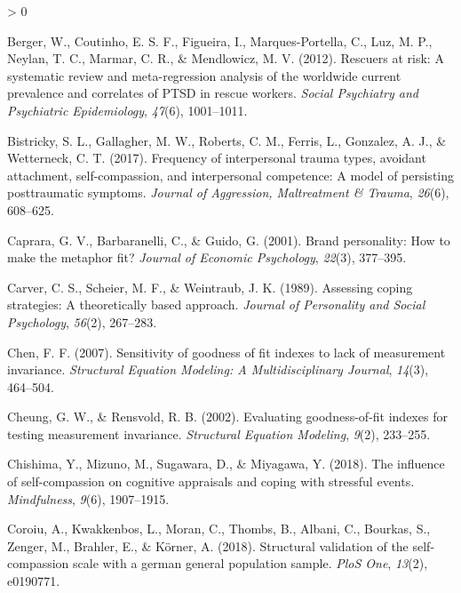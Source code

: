 \documentclass[
  english,
  man,floatsintext]{apa7}
\newlength{\cslhangindent}
\newenvironment{CSLReferences}[2] %
 {%
  \setlength{\parindent}{0pt}
  \ifodd #1 \everypar{\setlength{\hangindent}{\cslhangindent}}\ignorespaces\fi
  \ifnum #2 > 0
  \setlength{\parskip}{#2\baselineskip}
  \fi
 }%
 {}
\begin{document}
\begin{CSLReferences}{1}{0}
\leavevmode\hypertarget{ref-berger2012rescuers}{}%
Berger, W., Coutinho, E. S. F., Figueira, I., Marques-Portella, C., Luz, M. P., Neylan, T. C., Marmar, C. R., \& Mendlowicz, M. V. (2012). Rescuers at risk: A systematic review and meta-regression analysis of the worldwide current prevalence and correlates of PTSD in rescue workers. \emph{Social Psychiatry and Psychiatric Epidemiology}, \emph{47}(6), 1001--1011.

\leavevmode\hypertarget{ref-bistricky2017frequency}{}%
Bistricky, S. L., Gallagher, M. W., Roberts, C. M., Ferris, L., Gonzalez, A. J., \& Wetterneck, C. T. (2017). Frequency of interpersonal trauma types, avoidant attachment, self-compassion, and interpersonal competence: A model of persisting posttraumatic symptoms. \emph{Journal of Aggression, Maltreatment \& Trauma}, \emph{26}(6), 608--625.

\leavevmode\hypertarget{ref-caprara2001brand}{}%
Caprara, G. V., Barbaranelli, C., \& Guido, G. (2001). Brand personality: How to make the metaphor fit? \emph{Journal of Economic Psychology}, \emph{22}(3), 377--395.

\leavevmode\hypertarget{ref-carver1989assessing}{}%
Carver, C. S., Scheier, M. F., \& Weintraub, J. K. (1989). Assessing coping strategies: A theoretically based approach. \emph{Journal of Personality and Social Psychology}, \emph{56}(2), 267--283.

\leavevmode\hypertarget{ref-chen2007sensitivity}{}%
Chen, F. F. (2007). Sensitivity of goodness of fit indexes to lack of measurement invariance. \emph{Structural Equation Modeling: A Multidisciplinary Journal}, \emph{14}(3), 464--504.

\leavevmode\hypertarget{ref-cheung2002evaluating}{}%
Cheung, G. W., \& Rensvold, R. B. (2002). Evaluating goodness-of-fit indexes for testing measurement invariance. \emph{Structural Equation Modeling}, \emph{9}(2), 233--255.

\leavevmode\hypertarget{ref-chishima2018influence}{}%
Chishima, Y., Mizuno, M., Sugawara, D., \& Miyagawa, Y. (2018). The influence of self-compassion on cognitive appraisals and coping with stressful events. \emph{Mindfulness}, \emph{9}(6), 1907--1915.

\leavevmode\hypertarget{ref-coroiu2018structural}{}%
Coroiu, A., Kwakkenbos, L., Moran, C., Thombs, B., Albani, C., Bourkas, S., Zenger, M., Brahler, E., \& Körner, A. (2018). Structural validation of the self-compassion scale with a german general population sample. \emph{PloS One}, \emph{13}(2), e0190771.


\end{CSLReferences}
\end{document}
